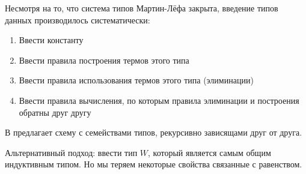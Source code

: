 Несмотря на то, что система типов Мартин-Лёфа закрыта, введение типов данных
производилось систематически:
\begin{enumerate}
\item Ввести константу
\item Ввести правила построения термов этого типа
\item Ввести правила использования термов этого типа (элиминации)
\item Ввести правила вычисления, по которым правила элиминации и построения
  обратны друг другу
\end{enumerate}

В \cite{inductive-families} предлагает схему с семействами типов, рекурсивно
зависящами друг от друга.

Альтернативный подход: ввести тип \(W\), который является самым общим индуктивным
типом. Но мы теряем некоторые свойства связанные с равенством.
